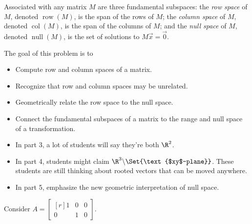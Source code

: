 \documentclass{problemset}
\DeclareMathOperator{\Null}{null}
\DeclareMathOperator{\Row}{row}
\DeclareMathOperator{\Col}{col}
\newcommand{\mat}[1]{\begin{bmatrix*}[r]#1\end{bmatrix*}}
\newcommand{\displayonlynewpage}{\begin{displayonly}\newpage\end{displayonly}}
\begin{document}
	\displayonlynewpage
	\begin{definition}
		Associated with any matrix $M$ are three fundamental subspaces:
		the \emph{row space} of $M$, denoted $\Row(M)$, is the span of the rows of $M$;
		the \emph{column space} of $M$, denoted $\Col(M)$, is the span of the columns of $M$;
		and the \emph{null space} of $M$, denoted $\Null(M)$, is the set of solutions to $M\vec x=\vec 0$.
	\end{definition}

	\question
	\begin{annotation}
		\begin{goals}

			The goal of this problem is to
			\begin{itemize}
				\item Compute row and column spaces of a matrix.
				\item Recognize that row and column spaces may be unrelated.
				\item Geometrically relate the row space to the null space.
				\item Connect the fundamental subspaces of a matrix to the
					range and null space of a transformation.
			\end{itemize}
		\end{goals}

		\begin{notes}
			\begin{itemize}
				\item In part 3, a lot of students will say they're both $\R^2$.
				\item In part 4, students might claim $\R^3\backslash\Set{\text{$xy$-plane}}$.
					These students are still thinking about rooted vectors that can be moved anywhere.
				\item In part 5, emphasize the new geometric interpretation of null space.
			\end{itemize}
		\end{notes}
	\end{annotation}
	\label{fundamentalSubspaces}
	Consider $A=\mat{1&0&0\\0&1&0}$.
\end{document}
